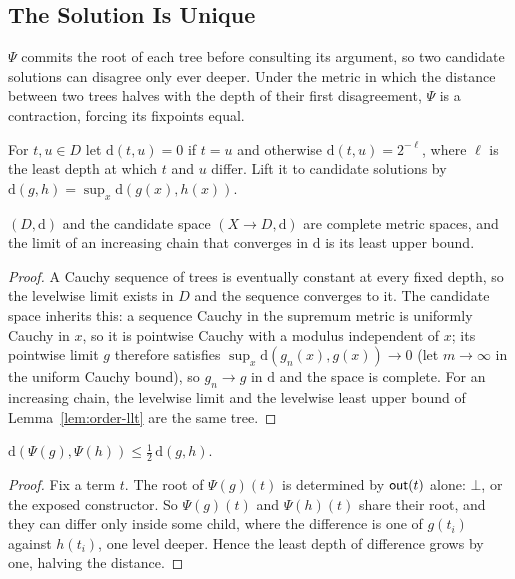 \subsection{The Solution Is Unique}\label{sec:order}

$\Psi$ commits the root of each tree before consulting its argument, so two candidate solutions can disagree only ever deeper. Under the metric in which the distance between two trees halves with the depth of their first disagreement, $\Psi$ is a contraction, forcing its fixpoints equal.

\begin{definition}\label{def:metric}
  For $t, u \in D$ let $\mathrm{d}(t, u) = 0$ if $t = u$ and otherwise $\mathrm{d}(t, u) = 2^{-\ell}$, where $\ell$ is the least depth at which $t$ and $u$ differ. Lift it to candidate solutions by $\mathrm{d}(g, h) = \sup_x \mathrm{d}(g(x), h(x))$.
\end{definition}

\begin{lemma}[Completeness]\label{lem:metric}
  $(D, \mathrm{d})$ and the candidate space $(X \to D, \mathrm{d})$ are complete metric spaces, and the limit of an increasing chain that converges in $\mathrm{d}$ is its least upper bound.
\end{lemma}
\begin{proof}
  A Cauchy sequence of trees is eventually constant at every fixed depth, so the levelwise limit exists in $D$ and the sequence converges to it. The candidate space inherits this: a sequence Cauchy in the supremum metric is uniformly Cauchy in $x$, so it is pointwise Cauchy with a modulus independent of $x$; its pointwise limit $g$ therefore satisfies $\sup_x \mathrm{d}(g_n(x), g(x)) \to 0$ (let $m \to \infty$ in the uniform Cauchy bound), so $g_n \to g$ in $\mathrm{d}$ and the space is complete. For an increasing chain, the levelwise limit and the levelwise least upper bound of Lemma~\ref{lem:order-llt} are the same tree.
\end{proof}

\begin{lemma}[Guardedness]\label{lem:guarded}
  $\mathrm{d}(\Psi(g), \Psi(h)) \le \tfrac{1}{2}\,\mathrm{d}(g, h)$.
\end{lemma}
\begin{proof}
  Fix a term $t$. The root of $\Psi(g)(t)$ is determined by $\mathsf{out}(t)$ alone: $\bot$, or the exposed constructor. So $\Psi(g)(t)$ and $\Psi(h)(t)$ share their root, and they can differ only inside some child, where the difference is one of $g(t_i)$ against $h(t_i)$, one level deeper. Hence the least depth of difference grows by one, halving the distance.
\end{proof}

